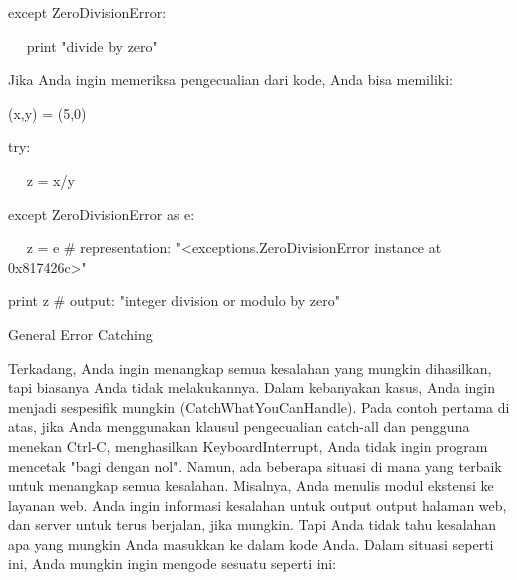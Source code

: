 {\fontsize{10pt}{10pt}\selectfont  except ZeroDivisionError:} \par
\noindent 

{\fontsize{10pt}{10pt}\selectfont ~~ print "divide by zero"} \par
\noindent 
\vspace{10pt}
\noindent 
Jika Anda ingin memeriksa pengecualian dari kode, Anda bisa memiliki: \par
\noindent 
\vspace{12pt}
\noindent 
\vspace{12pt}
\noindent 
\vspace{12pt}
\noindent 

{\fontsize{10pt}{10pt}\selectfont  (x,y) = (5,0)} \par
\noindent 

{\fontsize{10pt}{10pt}\selectfont  try:} \par
\noindent 

{\fontsize{10pt}{10pt}\selectfont ~~ z = x/y} \par
\noindent 

{\fontsize{10pt}{10pt}\selectfont  except ZeroDivisionError as e:} \par
\noindent 

{\fontsize{10pt}{10pt}\selectfont ~~ z = e  $  \#  $ representation: "<exceptions.ZeroDivisionError instance at 0x817426c>"} \par
\noindent 

{\fontsize{10pt}{10pt}\selectfont  print z  $  \#  $ output: "integer division or modulo by zero"} \par
\noindent 
\vspace{16pt}
\noindent 
General Error Catching \par
\noindent 
\vspace{12pt}
\noindent 
 \hspace*{0.64in} Terkadang, Anda ingin menangkap semua kesalahan yang mungkin dihasilkan, tapi biasanya Anda tidak melakukannya. Dalam kebanyakan kasus, Anda ingin menjadi sespesifik mungkin (CatchWhatYouCanHandle). Pada contoh pertama di atas, jika Anda menggunakan klausul pengecualian catch-all dan pengguna menekan Ctrl-C, menghasilkan KeyboardInterrupt, Anda tidak ingin program mencetak "bagi dengan nol". Namun, ada beberapa situasi di mana yang terbaik untuk menangkap semua kesalahan. Misalnya, Anda menulis modul ekstensi ke layanan web. Anda ingin informasi kesalahan untuk output output halaman web, dan server untuk terus berjalan, jika mungkin. Tapi Anda tidak tahu kesalahan apa yang mungkin Anda masukkan ke dalam kode Anda. Dalam situasi seperti ini, Anda mungkin ingin mengode sesuatu seperti ini: \par
\vspace{12pt}
\noindent 

